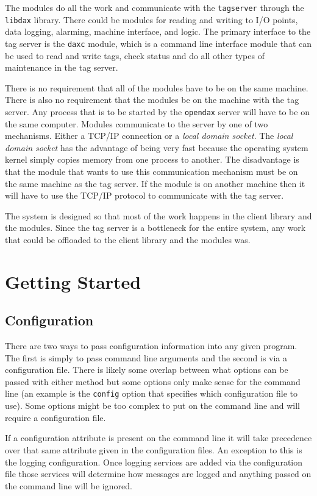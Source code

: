 The modules do all the work and communicate with the \texttt{tagserver} through the \texttt{libdax} library. There could be modules for reading and writing to I/O points, data logging, alarming, machine interface, and logic. The primary interface to the tag server is the \texttt{daxc} module, which is a command line interface module that can
be used to read and write tags, check status and do all other types of maintenance in the tag server.

There is no requirement that all of the modules have to be on the same machine.  There is also no requirement that the modules be on the machine with the tag server.  Any process that is to be started by the \texttt{opendax} server will have to be on the same computer.  Modules communicate to the server by one of two mechanisms.  Either a TCP/IP connection or a \textit{local domain socket}.  The \textit{local domain socket} has the advantage of being very fast because the operating system kernel simply copies memory from one process to another.  The disadvantage is that the module that wants to use this communication mechanism must be on the same machine as the tag server. If the module is on another machine then it will have to use the TCP/IP protocol to communicate with the tag server.

The system is designed so that most of the work happens in the client library and the modules.  Since the tag
server is a bottleneck for the entire system, any work that could be offloaded to the client library and the
modules was.

\chapter{Getting Started}


\section{Configuration}
There are two ways to pass configuration information into any given \opendax program.  The first is simply to pass command line arguments and the second is via a configuration file.  There is likely some overlap between what options can be passed with either method but some options only make sense for the command line (an example is the \texttt{config} option that specifies which configuration file to use).  Some options might be too complex to put on the command line and will require a configuration file.

If a configuration attribute is present on the command line it will take precedence over that same attribute given in the configuration files.  An exception to this is the logging configuration.  Once logging services are added via the configuration file those services will determine how messages are logged and anything passed on the  command line will be ignored.

